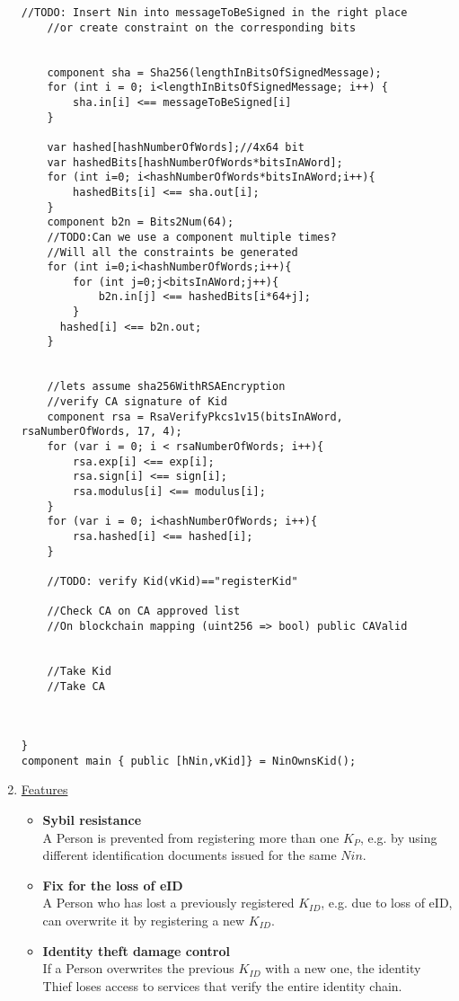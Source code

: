 \documentclass{article}
\newcommand{\khk}{K_{P}}
\newcommand{\kid}{K_{ID}}
\begin{document}
\begin{enumerate}[leftmargin=0cm]
\begin{lstlisting}[language=circom]
	//TODO: Insert Nin into messageToBeSigned in the right place
	//or create constraint on the corresponding bits


	component sha = Sha256(lengthInBitsOfSignedMessage);
	for (int i = 0; i<lengthInBitsOfSignedMessage; i++) {
		sha.in[i] <== messageToBeSigned[i]
	}

	var hashed[hashNumberOfWords];//4x64 bit
	var hashedBits[hashNumberOfWords*bitsInAWord];
	for (int i=0; i<hashNumberOfWords*bitsInAWord;i++){
		hashedBits[i] <== sha.out[i];
	}
	component b2n = Bits2Num(64);
	//TODO:Can we use a component multiple times?
	//Will all the constraints be generated
	for (int i=0;i<hashNumberOfWords;i++){
		for (int j=0;j<bitsInAWord;j++){
			b2n.in[j] <== hashedBits[i*64+j];
		}
	  hashed[i] <== b2n.out;
	}

	
	//lets assume sha256WithRSAEncryption
	//verify CA signature of Kid
	component rsa = RsaVerifyPkcs1v15(bitsInAWord, rsaNumberOfWords, 17, 4);
	for (var i = 0; i < rsaNumberOfWords; i++){
		rsa.exp[i] <== exp[i];
		rsa.sign[i] <== sign[i];
		rsa.modulus[i] <== modulus[i];
	}
	for (var i = 0; i<hashNumberOfWords; i++){
		rsa.hashed[i] <== hashed[i];
	}

	//TODO: verify Kid(vKid)=="registerKid"

	//Check CA on CA approved list
	//On blockchain mapping (uint256 => bool) public CAValid

	
	//Take Kid
	//Take CA

	
	
}
component main { public [hNin,vKid]} = NinOwnsKid();
\end{lstlisting}
\xdef\tpd{\the\prevdepth}

\item[] \underline{Features}
    \begin{itemize}
      \item[] \textbf{Sybil resistance} \\ A Person is prevented from registering more than one $\khk$, e.g. by using different identification documents issued for the same $Nin$.
          \vspace{5px}
      \item[] \textbf{Fix for the loss of eID} \\ A Person who has lost a previously registered $\kid$, e.g. due to loss of eID, can overwrite it by registering a new $\kid$.
          \vspace{5px}
      \item[] \textbf{Identity theft damage control} \\ If a Person overwrites the previous $\kid$ with a new one, the identity Thief loses access to services that verify the entire identity chain.
    \end{itemize}


\end{enumerate}
\end{document}
